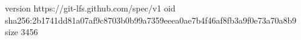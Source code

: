 version https://git-lfs.github.com/spec/v1
oid sha256:2b1741dd81a07af9c8703b0b99a7359eeea0ae7b4f46af8fb3a9f0e73a70a8b9
size 3456
